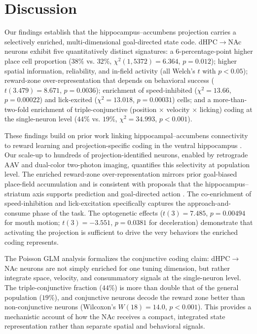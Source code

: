 \documentclass[11pt]{article}
\begin{document}
\section{Discussion}

Our findings establish that the hippocampus--accumbens projection carries a selectively enriched, multi-dimensional goal-directed state code. dHPC$\to$NAc neurons exhibit five quantitatively distinct signatures: a $6$-percentage-point higher place cell proportion ($38\%$ vs. $32\%$, $\chi^2(1,5372) = 6.364$, $p=0.012$); higher spatial information, reliability, and in-field activity (all Welch's $t$ with $p<0.05$); reward-zone over-representation that depends on behavioral success ($t(3.479) = 8.671$, $p=0.0036$); enrichment of speed-inhibited ($\chi^2 = 13.66$, $p=0.00022$) and lick-excited ($\chi^2 = 13.018$, $p=0.00031$) cells; and a more-than-two-fold enrichment of triple-conjunctive (position $\times$ velocity $\times$ licking) coding at the single-neuron level ($44\%$ vs. $19\%$, $\chi^2 = 34.993$, $p<0.001$).

These findings build on prior work linking hippocampal--accumbens connectivity to reward learning \citep{mogenson1980motivation,ito2008functional,britt2012synaptic,legates2018distinct,trouche2019hippocampus} and projection-specific coding in the ventral hippocampus \citep{ciocchi2015selective,xu2016ventral}. Our scale-up to hundreds of projection-identified neurons, enabled by retrograde AAV \citep{tervo2016designer} and dual-color two-photon imaging, quantifies this selectivity at population level. The enriched reward-zone over-representation mirrors prior goal-biased place-field accumulation \citep{hollup2001accumulation,dupret2010reactivation,gauthier2018dedicated} and is consistent with proposals that the hippocampus--striatum axis supports prediction and goal-directed action \citep{pennartz2011ventral,vandermeer2010integrating,sosa2021dorsal}. The co-enrichment of speed-inhibition and lick-excitation specifically captures the approach-and-consume phase of the task. The optogenetic effects ($t(3) = 7.485$, $p=0.00494$ for mouth motion; $t(3) = -3.551$, $p=0.0381$ for deceleration) demonstrate that activating the projection is sufficient to drive the very behaviors the enriched coding represents.

The Poisson GLM analysis \citep{hardcastle2017multiplexed,sauer2019glm} formalizes the conjunctive coding claim: dHPC$\to$NAc neurons are not simply enriched for one tuning dimension, but rather integrate space, velocity, and consummatory signals at the single-neuron level. The triple-conjunctive fraction ($44\%$) is more than double that of the general population ($19\%$), and conjunctive neurons decode the reward zone better than non-conjunctive neurons (Wilcoxon's $W(18) = 14.0$, $p<0.001$). This provides a mechanistic account of how the NAc receives a compact, integrated state representation rather than separate spatial and behavioral signals.
\end{document}
